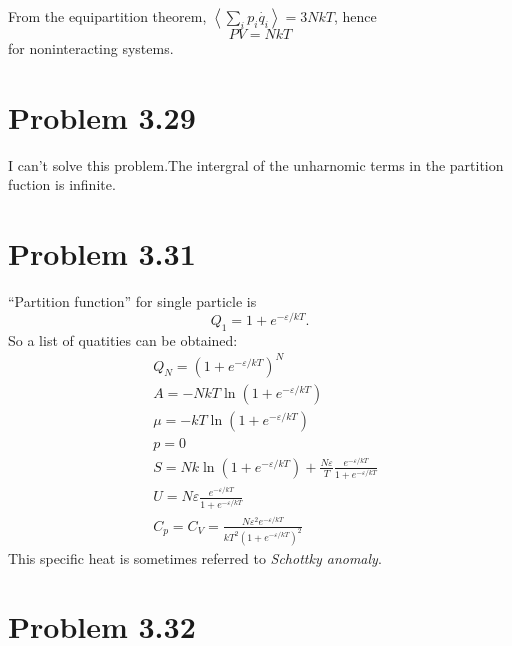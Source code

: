 \documentclass{article}
\begin{document}
	From the equipartition theorem, $\left<\sum_i p_i \dot{q_i} \right> = 3NkT  $, hence
	\begin{equation*}
		PV=NkT
	\end{equation*}
	for noninteracting systems.

\section*{Problem 3.29}
	I can't solve this problem.The intergral of the unharnomic terms in the partition fuction is infinite.
	
\section*{Problem 3.31}
	``Partition function'' for single particle is
	\begin{equation}
	Q_{1} = 1 + e^{-\varepsilon/kT}.
	\end{equation}
	So a list of quatities can be obtained:
	\begin{align}
	&Q_{N} = (1 + e^{-\varepsilon/kT})^{N} \\
	&A = - NkT \ln (1 + e^{-\varepsilon/kT}) \\
	&\mu = - kT \ln (1 + e^{-\varepsilon/kT}) \\
	&p=0 \\
	&S = Nk \ln (1 + e^{-\varepsilon/kT}) + \frac{N \varepsilon}{T} \frac{e^{-\varepsilon/kT}}{1+e^{-\varepsilon/kT}} \\
	&U =  N \varepsilon \frac{e^{-\varepsilon/kT}}{1+e^{-\varepsilon/kT}} \\
	&C_{p} = C_{V} =  \frac{N \varepsilon^{2} e^{-\varepsilon/kT}}{kT^{2} (1+e^{-\varepsilon/kT})^{2}}
	\end{align}
	This specific heat is sometimes referred to \emph{Schottky anomaly}. 

\section*{Problem 3.32}
\end{document}
